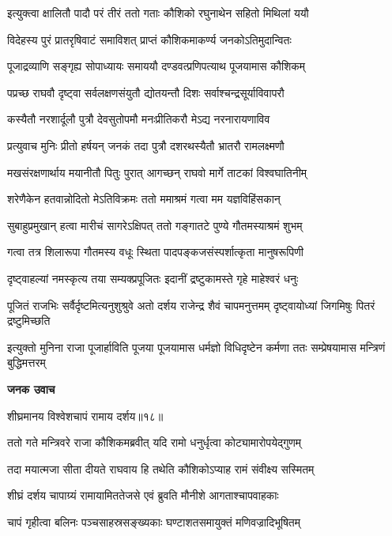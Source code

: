 \twolineshloka
{इत्युक्त्वा क्षालितौ पादौ परं तीरं ततो गताः}
{कौशिको रघुनाथेन सहितो मिथिलां ययौ} %

\twolineshloka
{विदेहस्य पुरं प्रातरृषिवाटं समाविशत्}
{प्राप्तं कौशिकमाकर्ण्य जनकोऽतिमुदान्वितः} %

\twolineshloka
{पूजाद्रव्याणि सङ्गृह्य सोपाध्यायः समाययौ}
{दण्डवत्प्रणिपत्याथ पूजयामास कौशिकम्} %

\twolineshloka
{पप्रच्छ राघवौ दृष्ट्वा सर्वलक्षणसंयुतौ}
{द्योतयन्तौ दिशः सर्वाश्चन्द्रसूर्याविवापरौ} %

\twolineshloka
{कस्यैतौ नरशार्दूलौ पुत्रौ देवसुतोपमौ}
{मनःप्रीतिकरौ मेऽद्य नरनारायणाविव} %

\twolineshloka
{प्रत्युवाच मुनिः प्रीतो हर्षयन् जनकं तदा}
{पुत्रौ दशरथस्यैतौ भ्रातरौ रामलक्ष्मणौ} %

\twolineshloka
{मखसंरक्षणार्थाय मयानीतौ पितुः पुरात्}
{आगच्छन् राघवो मार्गे ताटकां विश्वघातिनीम्} %

\twolineshloka
{शरेणैकेन हतवान्नोदितो मेऽतिविक्रमः}
{ततो ममाश्रमं गत्वा मम यज्ञविहिंसकान्} %

\twolineshloka
{सुबाहुप्रमुखान् हत्वा मारीचं सागरेऽक्षिपत्}
{ततो गङ्गातटे पुण्ये गौतमस्याश्रमं शुभम्} %

\twolineshloka
{गत्वा तत्र शिलारूपा गौतमस्य वधूः स्थिता}
{पादपङ्कजसंस्पर्शात्कृता मानुषरूपिणी} %

\twolineshloka
{दृष्ट्वाहल्यां नमस्कृत्य तया सम्यक्प्रपूजितः}
{इदानीं द्रष्टुकामस्ते गृहे माहेश्वरं धनुः} %

\threelineshloka
{पूजितं राजभिः सर्वैर्दृष्टमित्यनुशुश्रुवे}
{अतो दर्शय राजेन्द्र शैवं चापमनुत्तमम्}
{दृष्ट्वायोध्यां जिगमिषुः पितरं द्रष्टुमिच्छति} %

\threelineshloka
{इत्युक्तो मुनिना राजा पूजार्हाविति पूजया}
{पूजयामास धर्मज्ञो विधिदृष्टेन कर्मणा}
{ततः सम्प्रेषयामास मन्त्रिणं बुद्धिमत्तरम्} %

\textbf{जनक उवाच}

{शीघ्रमानय विश्वेशचापं रामाय दर्शय॥१८॥} %


\twolineshloka
{ततो गते मन्त्रिवरे राजा कौशिकमब्रवीत्}
{यदि रामो धनुर्धृत्वा कोट्यामारोपयेद्गुणम्} %

\twolineshloka
{तदा मयात्मजा सीता दीयते राघवाय हि}
{तथेति कौशिकोऽप्याह रामं संवीक्ष्य सस्मितम्} %

\twolineshloka
{शीघ्रं दर्शय चापाग्र्यं रामायामिततेजसे}
{एवं ब्रुवति मौनीशे आगताश्चापवाहकाः} %

\twolineshloka
{चापं गृहीत्वा बलिनः पञ्चसाहस्रसङ्ख्यकाः}
{घण्टाशतसमायुक्तं मणिवज्रादिभूषितम्} %

